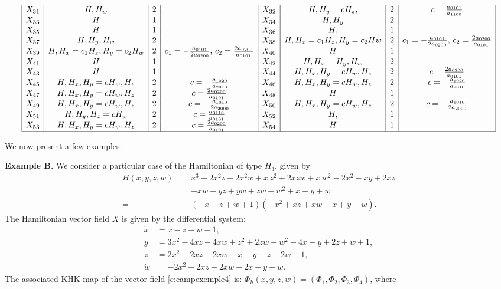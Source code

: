\documentclass[11pt]{article}
\begin{document}
\begin{table}
{$$\begin{array}{|c|c|c|c|c|c|c|c|}
X_{31} & H, H_w & 2& &
X_{32} & H, H_y=cH_z, & 2&c=\frac{a_{0101}}{a_{1100}}\\
X_{33} & H & 1& &
X_{34} & H, H_y  & 2&\\
X_{35} & H & 1&  &
X_{36} & H,  & 1&\\
X_{37} & H, H_y,  H_w & 2&  &
X_{38} & H, H_x=c_1H_z, H_y=c_2Hw  & 2&c_1=-\frac{a_{0101}}{2 a_{0200}}, \, c_2=\frac{2 a_{0200}}{a_{0101}} \\
X_{39} & H, H_x=c_1H_z, H_y=c_2H_w & 2&c_1=-\frac{a_{0101}}{2 a_{0200}}, \, c_2=\frac{2 a_{0200}}{a_{0101}}  &
X_{40} & H & 1&\\
X_{41} & H & 1&  &
X_{42} & H, H_x=H_y,  H_w & 2&\\
X_{43} & H & 1&  &
X_{44} & H, H_x, H_y=cH_w, H_z & 2&c=\frac{2 a_{0200}}{a_{0101}}\\
X_{45} & H, H_x, H_y=cH_w, H_z & 2&c=-\frac{a_{1020}}{a_{2010}}&
X_{46} & H, H_x, H_y=cH_w, H_z & 2&c=-\frac{a_{1020}}{a_{2010}}\\
X_{47} & H, H_x, H_y=cH_w, H_z & 2&c=\frac{2 a_{0200}}{a_{0101}} &
X_{48} & H & 1&\\
X_{49} & H, H_x, H_y=cH_w, H_z & 2&c=-\frac{a_{1010}}{2 a_{2000}}&
X_{50} & H, H_x, H_y=cH_w, H_z & 2&c=-\frac{a_{1010}}{2 a_{2000}}\\
X_{51} & H,  H_y, H_z=cH_w & 2&c=\frac{a_{0110}}{a_{0101}}  &
X_{52} & H,  & 1&\\
X_{53} & H, H_x, H_y=cH_w, H_z & 2&c=\frac{2 a_{0200}}{a_{0101}}  &
X_{54} & H & 1&\\
\hline
\end{array}
$$}
\caption{Additional first integrals for the systems $X_i$ associated to the Hamiltonians $H_i$ in Appendix \ref{s:appendixa}.}\label{t:table2}
\end{table}

\vfill
\newpage

We now present a few examples.

\medskip

\noindent \textbf{Example B.}  We consider  a particular case of the Hamiltonian of type $H_3$, given by
\begin{align*}
H(x,y,z,w)=&x^{3}-2 x^{2} z -2 x^{2} w +x \,z^{2}+2 x z w +x \,w^{2}-2 x^{2}-x y +2 x z \\
&+x w +y z +y w +z w +w^{2}+x +y +w\\
=& \left(-x +z +w+1\right) \left(-x^{2}+x z+x w   +x +y+w \right).
\end{align*}
The Hamiltonian vector field $X$ is given by the differential system:
\begin{align}
\dot{x}&=x -z -w -1,\nonumber\\
\dot{y}&=3 x^{2}-4 x z -4 x w +z^{2}+2 z w +w^{2}-4 x -y +2 z +w +1,\label{e:campexemple4}\\
\dot{z}&=2 x^{2}-2 x z -2 x w -x -y -z -2 w -1,\nonumber\\
\dot{w}&=-2 x^{2}+2 x z +2 x w +2 x +y +w.\nonumber
\end{align}
The associated KHK map of the vector field \eqref{e:campexemple4} is:
$\Phi_{h}(x,y,z,w)=(\Phi_1,\Phi_2,\Phi_3,\Phi_4)$,
where
\end{document}
